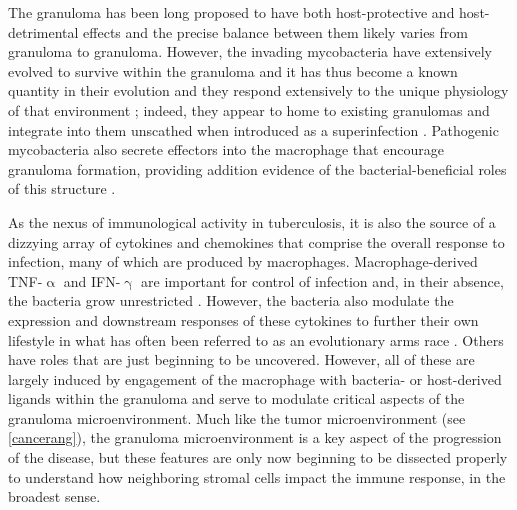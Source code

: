 The granuloma has been long proposed to have both host\hyp{}protective and host\hyp{}detrimental effects and the precise balance between them likely varies from granuloma to granuloma. However, the invading mycobacteria have extensively evolved to survive within the granuloma and it has thus become a known quantity in their evolution and they respond extensively to the unique physiology of that environment \citep{Gagneux2018, Ramakrishnan2000}; indeed, they appear to home to existing granulomas and integrate into them unscathed when introduced as a superinfection \citep{Cosma2004}. Pathogenic mycobacteria also secrete effectors into the macrophage that encourage granuloma formation, providing addition evidence of the bacterial\hyp{}beneficial roles of this structure \citep{Volkman2004, Volkman2010}. 

As the nexus of immunological activity in tuberculosis, it is also the source of a dizzying array of cytokines and chemokines that comprise the overall response to infection, many of which are produced by macrophages. Macrophage\hyp{}derived TNF\hyp{}$\upalpha$ and IFN\hyp{}$\upgamma$ are important for control of infection and, in their absence, the bacteria grow unrestricted \citep{Fenton1997, Flynn1993, Flynn1995, Algood2005}. However, the bacteria also modulate the expression and downstream responses of these cytokines to further their own lifestyle in what has often been referred to as an evolutionary arms race \citep{Ting1999}. Others have roles that are just beginning to be uncovered. However, all of these are largely induced by engagement of the macrophage with bacteria\hyp{} or host\hyp{}derived ligands within the granuloma and serve to modulate critical aspects of the granuloma microenvironment. Much like the tumor microenvironment (see \autoref{cancerang}), the granuloma microenvironment is a key aspect of the progression of the disease, but these features are only now beginning to be dissected properly to understand how neighboring stromal cells impact the immune response, in the broadest sense. 


